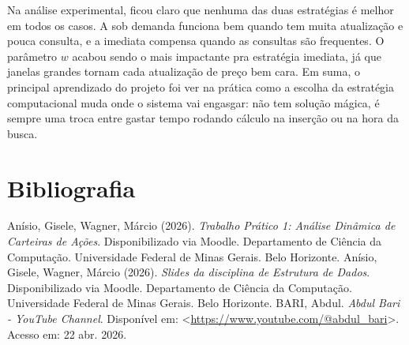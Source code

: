 \documentclass[12pt,a4paper]{article}
\begin{document}
Na análise experimental, ficou claro que nenhuma das duas estratégias é melhor em todos os casos. A sob demanda funciona bem quando tem muita atualização e pouca consulta, e a imediata compensa quando as consultas são frequentes. O parâmetro $w$ acabou sendo o mais impactante pra estratégia imediata, já que janelas grandes tornam cada atualização de preço bem cara. Em suma, o principal aprendizado do projeto foi ver na prática como a escolha da estratégia computacional muda onde o sistema vai engasgar: não tem solução mágica, é sempre uma troca entre gastar tempo rodando cálculo na inserção ou na hora da busca.

\section{Bibliografia}
Anísio, Gisele, Wagner, Márcio (2026). \textit{Trabalho Prático 1: Análise Dinâmica de Carteiras de Ações}. Disponibilizado via Moodle. Departamento de Ciência da Computação. Universidade Federal de Minas Gerais. Belo Horizonte.
Anísio, Gisele, Wagner, Márcio (2026). \textit{Slides da disciplina de Estrutura de Dados}. Disponibilizado via Moodle. Departamento de Ciência da Computação. Universidade Federal de Minas Gerais. Belo Horizonte.
BARI, Abdul. \textit{Abdul Bari - YouTube Channel}. Disponível em: <\url{https://www.youtube.com/@abdul_bari}>. Acesso em: 22 abr. 2026.
\end{document}
